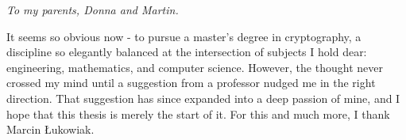 \documentclass[11pt,american]{report}
\begin{document}
\title{\vspace{-0.20in}{Design and Cryptanalysis of a Customizable Authenticated Encryption Algorithm}}
\date{August 2014}

\author{Matthew Joseph Kelly}



\beforepreface%

\vfill
\begin{center}
\emph{%
To my parents, Donna and Martin.
}
\end{center}
\vfill

\vfill
\linespread{1}
\selectfont
It seems so obvious now - to pursue a master's degree in cryptography, a discipline so elegantly balanced at the intersection of subjects I hold dear: engineering, mathematics, and computer science.
However, the thought never crossed my mind until a suggestion from a professor nudged me in the right direction.
That suggestion has since expanded into a deep passion of mine, and I hope that this thesis is merely the start of it.
For this and much more, I thank Marcin {\L}ukowiak.
\end{document}

